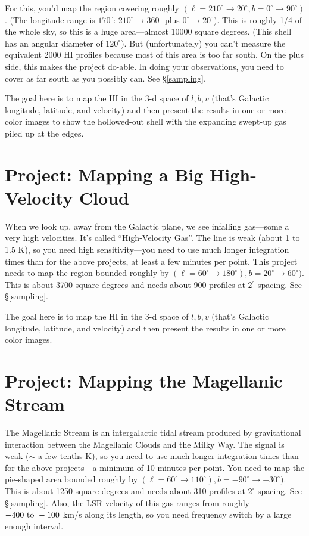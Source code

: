 \documentclass[psfig,preprint]{aastex}
\begin{document}
For this, you'd map the region covering roughly $(\ell=210^\circ
\rightarrow 20^\circ, b=0^\circ \rightarrow 90^\circ)$. (The longitude
range is $170^\circ$: $210^\circ \rightarrow 360^\circ$ plus $0^\circ
\rightarrow 20^\circ$). This is roughly 1/4 of the whole sky, so this is
a huge area---almost 10000 square degrees. (This shell has an angular
diameter of $120^\circ$). But (unfortunately) you can't measure the
equivalent 2000 HI profiles because most of this area is too far
south. On the plus side, this makes the project do-able. In doing your
observations, you need to cover as far south as you possibly can. See
\S \ref{sampling}.

The goal here is to map the HI in the 3-d space of ${l, b, v}$ (that's
Galactic longitude, latitude, and velocity) and then present the results
in one or more color images to show the hollowed-out shell with the
expanding swept-up gas piled up at the edges.

\section{Project: Mapping a Big High-Velocity Cloud}

\noindent
When we look up, away from the Galactic plane, we see infalling
gas---some a very high velocities. It's called ``High-Velocity Gas''.
The line is weak (about 1 to 1.5 K), so you need high sensitivity---you
need to use much longer integration times than for the above projects,
at least a few minutes per point.  This project needs to map the region
bounded roughly by $(\ell=60^\circ \rightarrow 180^\circ), b=20^\circ
\rightarrow 60^\circ)$. This is about 3700 square degrees and needs
about 900 profiles at $2^\circ$ spacing. See
\S \ref{sampling}.

The goal here is to map the HI in the 3-d space of ${l, b, v}$ (that's
Galactic longitude, latitude, and velocity) and then present the results
in one or more color images.

\section{Project: Mapping the Magellanic Stream}

\noindent
The Magellanic Stream is an intergalactic tidal stream produced by
gravitational interaction between the Magellanic Clouds and the Milky
Way. The signal is weak ($\sim$ a few tenths K), so you need to use much
longer integration times than for the above projects---a minimum of 10
minutes per point. You need to map the pie-shaped area bounded roughly
by $(\ell=60^\circ \rightarrow 110^\circ), b=-90^\circ \rightarrow
-30^\circ)$. This is about 1250 square degrees and needs about 310
profiles at $2^\circ$ spacing. See \S \ref{sampling}.  Also, the LSR
velocity of this gas ranges from roughly $-400 \ {\rm to} \ -100$ km/s
along its length, so you need frequency switch by a large enough
interval.
\end{document}
